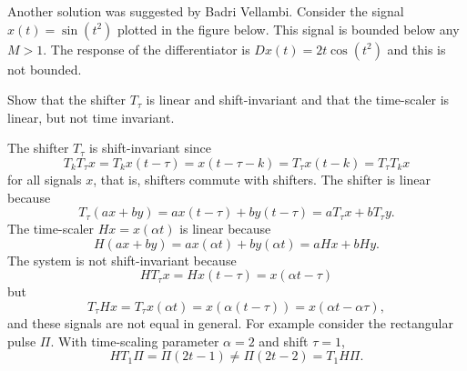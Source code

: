\begin{excersizelist}
\begin{solution}
Another solution was suggested by Badri Vellambi.  Consider the signal $x(t) = \sin( t^2)$ plotted in the figure below.  This signal is bounded below any $M > 1$.  The response of the differentiator is $Dx(t) = 2t \cos(t^2)$ and this is not bounded.

\begin{center}
\;\;
\end{center}

\end{solution}


\item Show that the shifter $T_\tau$ is linear and shift-invariant and that the time-scaler is linear, but not time invariant.
\begin{solution}
The shifter $T_\tau$ is shift-invariant since
\[
T_kT_\tau x  = T_kx(t - \tau) = x(t - \tau - k) = T_\tau x(t - k) = T_\tau T_k x 
\]
for all signals $x$, that is, shifters commute with shifters.  The shifter is linear because
\[
T_\tau(ax + by) = ax(t - \tau) + by(t - \tau) = a T_\tau x + b T_\tau y.
\]
The time-scaler $H x = x(\alpha t)$ is linear because
\[
H(ax + by) = ax(\alpha t) + by(\alpha t) = aHx + b Hy.
\]
The system is not shift-invariant because
\[
HT_\tau x = Hx(t-\tau) = x(\alpha t - \tau)
\]
but 
\[
T_\tau H x = T_\tau x(\alpha t) = x(\alpha(t - \tau)) = x( \alpha t - \alpha \tau ),
\]
and these signals are not equal in general.  For example consider the rectangular pulse $\Pi$.  With time-scaling parameter $\alpha = 2$ and shift $\tau = 1$,
\[
H T_1 \Pi = \Pi( 2 t - 1 ) \neq \Pi( 2t - 2 ) = T_1 H \Pi .
\]
\end{solution}


\end{excersizelist}
